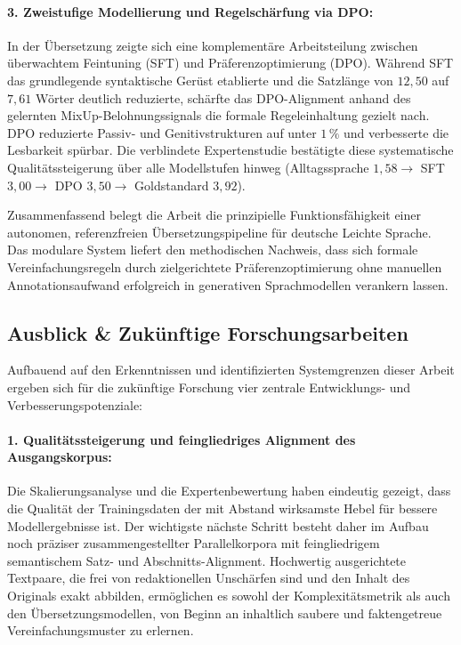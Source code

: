 \paragraph{3. Zweistufige Modellierung und Regelschärfung via DPO:}
In der Übersetzung zeigte sich eine komplementäre Arbeitsteilung zwischen überwachtem Feintuning (SFT) und Präferenzoptimierung (DPO). Während SFT das grundlegende syntaktische Gerüst etablierte und die Satzlänge von $12{,}50$ auf $7{,}61$ Wörter deutlich reduzierte, schärfte das DPO-Alignment anhand des gelernten MixUp-Belohnungssignals die formale Regeleinhaltung gezielt nach. DPO reduzierte Passiv- und Genitivstrukturen auf unter $1\,\%$ und verbesserte die Lesbarkeit spürbar. Die verblindete Expertenstudie bestätigte diese systematische Qualitätssteigerung über alle Modellstufen hinweg (Alltagssprache $1{,}58 \to$ SFT $3{,}00 \to$ DPO $3{,}50 \to$ Goldstandard $3{,}92$).

Zusammenfassend belegt die Arbeit die prinzipielle Funktionsfähigkeit einer autonomen, referenzfreien Übersetzungspipeline für deutsche Leichte Sprache. Das modulare System liefert den methodischen Nachweis, dass sich formale Vereinfachungsregeln durch zielgerichtete Präferenzoptimierung ohne manuellen Annotationsaufwand erfolgreich in generativen Sprachmodellen verankern lassen.

\subsection{Ausblick \& Zukünftige Forschungsarbeiten}
\label{sec:fazit_ausblick_zukunft}

Aufbauend auf den Erkenntnissen und identifizierten Systemgrenzen dieser Arbeit ergeben sich für die zukünftige Forschung vier zentrale Entwicklungs- und Verbesserungspotenziale:

\paragraph{1. Qualitätssteigerung und feingliedriges Alignment des Ausgangskorpus:}
Die Skalierungsanalyse und die Expertenbewertung haben eindeutig gezeigt, dass die Qualität der Trainingsdaten der mit Abstand wirksamste Hebel für bessere Modellergebnisse ist. Der wichtigste nächste Schritt besteht daher im Aufbau noch präziser zusammengestellter Parallelkorpora mit feingliedrigem semantischem Satz- und Abschnitts-Alignment. Hochwertig ausgerichtete Textpaare, die frei von redaktionellen Unschärfen sind und den Inhalt des Originals exakt abbilden, ermöglichen es sowohl der Komplexitätsmetrik als auch den Übersetzungsmodellen, von Beginn an inhaltlich saubere und faktengetreue Vereinfachungsmuster zu erlernen.

